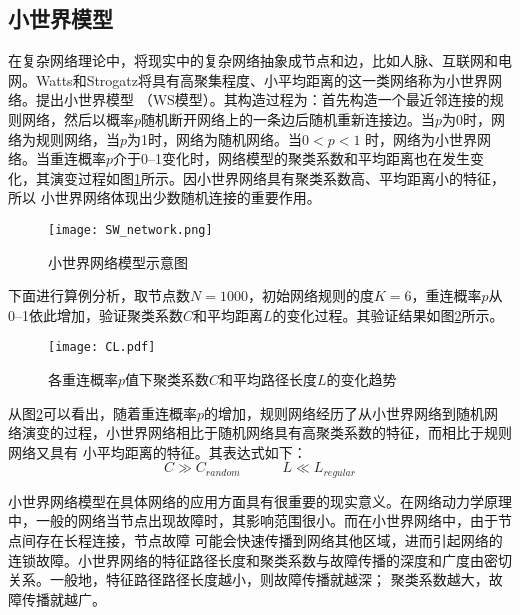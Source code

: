 \subsection{小世界模型}
\label{sec:windEffects}
在复杂网络理论中，将现实中的复杂网络抽象成节点和边，比如人脉、互联网和电网。Watts和Strogatz将具有高聚集程度、小平均距离的这一类网络称为小世界网络\cite{refsWS}。提出小世界模型
（WS模型）。其构造过程为：首先构造一个最近邻连接的规则网络，然后以概率$p$随机断开网络上的一条边后随机重新连接边。当$p$为0时，网络为规则网络，当$p$为1时，网络为随机网络。当$0<p<1$
时，网络为小世界网络。当重连概率$p$介于0--1变化时，网络模型的聚类系数和平均距离也在发生变化，其演变过程如图\ref{fig:SW}所示。因小世界网络具有聚类系数高、平均距离小的特征，所以
小世界网络体现出少数随机连接的重要作用。
\begin{figure}[H] %
    \centering
    \texttt{[image: SW\_network.png]}
    \caption{小世界网络模型示意图}
    \label{fig:SW}
  \end{figure}

下面进行算例分析，取节点数$N = 1000$，初始网络规则的度$K = 6$，重连概率$p$从0--1依此增加，验证聚类系数$C$和平均距离$L$的变化过程。其验证结果如图\ref{fig:CL}所示。
\begin{figure}[H] %
    \centering
    \texttt{[image: CL.pdf]}
    \caption{各重连概率$p$值下聚类系数$C$和平均路径长度$L$的变化趋势}
    \label{fig:CL}
\end{figure}

从图\ref{fig:CL}可以看出，随着重连概率$p$的增加，规则网络经历了从小世界网络到随机网络演变的过程，小世界网络相比于随机网络具有高聚类系数的特征，而相比于规则网络又具有
小平均距离的特征。其表达式如下：
\begin{equation}
\label{equ:chap2:CL}
 C\gg C_{random} \quad \quad\quad L \ll L_{regular}
\end{equation}

小世界网络模型在具体网络的应用方面具有很重要的现实意义。在网络动力学原理中，一般的网络当节点出现故障时，其影响范围很小。而在小世界网络中，由于节点间存在长程连接，节点故障
可能会快速传播到网络其他区域，进而引起网络的连锁故障。小世界网络的特征路径长度和聚类系数与故障传播的深度和广度由密切关系。一般地，特征路径路径长度越小，则故障传播就越深；
聚类系数越大，故障传播就越广\cite{refs41}。

